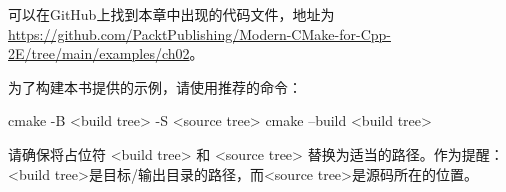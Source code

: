 可以在GitHub上找到本章中出现的代码文件，地址为 \url{https://github.com/PacktPublishing/Modern-CMake-for-Cpp-2E/tree/main/examples/ch02}。

为了构建本书提供的示例，请使用推荐的命令：

\begin{shell}
cmake -B <build tree> -S <source tree>
cmake --build <build tree>
\end{shell}

请确保将占位符 <build tree> 和 <source tree> 替换为适当的路径。作为提醒：<build tree>是目标/输出目录的路径，而<source tree>是源码所在的位置。












